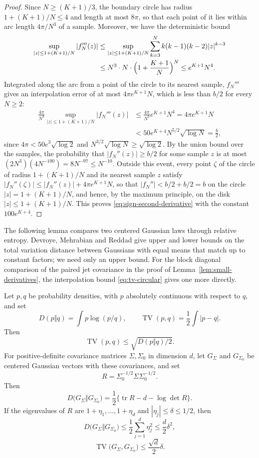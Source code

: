 \begin{proof}
Since $N\ge(K+1)/3$, the boundary circle has radius $1+(K+1)/N\le4$ and
length at most $8\pi$, so that
each point of it lies within arc length $4\pi/N^3$ of a sample.
Moreover, we have the deterministic bound
\begin{align*}
 \sup_{|z|\le1+(K+1)/N}|f_N'''(z)|
 &\le\sup_{|z|\le1+(K+1)/N}\sum_{k=3}^Nk(k-1)(k-2)|z|^{k-3}\\
 &\le N^3\cdot N\cdot\Bigl(1+\frac{K+1}N\Bigr)^N
 \le e^{K+1}N^4.
\end{align*}
Integrated along the arc from a point of the circle to its nearest
sample, $f_N'''$ gives an interpolation error of at most
$4\pi e^{K+1}N$, which is less than $b/2$ for every $N\ge2$:
\begin{align*}
 \frac{4\pi}{N^3}\sup_{|z|\le1+(K+1)/N}|f_N'''(z)|
 &\le\frac{4\pi}{N^3}e^{K+1}N^4
 =4\pi e^{K+1}N\\
 &<50e^{K+4}N^{5/2}\sqrt{\log N}
 =\frac b2,
\end{align*}
since $4\pi<50e^3\sqrt{\log2}$ and $N^{3/2}\sqrt{\log N}\ge\sqrt{\log2}$.
By the union bound over the samples, the probability that
$|f_N''(z)|\ge b/2$ for some sample $z$ is at most
$(2N^3)(4N^{-100})=8N^{-97}\le N^{-10}$.
Outside this event, every point $\zeta$ of the circle of radius
$1+(K+1)/N$ and its nearest sample $z$ satisfy
$|f_N''(\zeta)|\le|f_N''(z)|+4\pi e^{K+1}N$, so that
$|f_N''|<b/2+b/2=b$ on the circle
$|z|=1+(K+1)/N$, and hence, by the maximum principle, on the disk
$|z|\le1+(K+1)/N$. This proves \eqref{eq:sign-second-derivative} with the
constant $100e^{K+4}$.
\end{proof}

The following lemma compares two centered Gaussian laws through
relative entropy. Devroye, Mehrabian and Reddad
\cite{DevroyeMehrabianReddad2018} give upper and lower bounds on the total
variation distance between Gaussians with equal means that match up to
constant factors; we need only an upper bound. For the block diagonal
comparison of the paired jet covariance in the proof of
Lemma~\ref{lem:small-derivatives}, the interpolation bound
\eqref{eq:tv-circular} gives one more directly.

\begin{lemma}\label{lem:entropy}
Let $p,q$ be probability densities, with $p$ absolutely continuous with
respect to $q$, and set
\[
 D(p\Vert q)=\int p\log(p/q),
 \qquad \operatorname{TV}(p,q)=\frac12\int|p-q|.
\]
Then
\[
 \operatorname{TV}(p,q)\le\sqrt{D(p\Vert q)/2}.
\]
For positive-definite covariance matrices $\Sigma,\Sigma_0$ in dimension $d$, let
$G_\Sigma$ and $G_{\Sigma_0}$ be centered Gaussian vectors with these covariances, and set
\[
 R=\Sigma_0^{-1/2}\Sigma\Sigma_0^{-1/2}.
\]
Then
\[
 D\bigl(G_\Sigma\Vert G_{\Sigma_0}\bigr)
 =\frac12\{\operatorname{tr}R-d-\log\det R\}.
\]
If the eigenvalues of $R$ are $1+\eta_1,\ldots,1+\eta_d$ and
$|\eta_j|\le\delta\le1/2$, then
\[
 D\bigl(G_\Sigma\Vert G_{\Sigma_0}\bigr)
 \le\frac12\sum_{j=1}^d\eta_j^2\le\frac d2\delta^2,
\]
\[
 \operatorname{TV}\bigl(G_\Sigma,G_{\Sigma_0}\bigr)
 \le\frac{\sqrt d}{2}\delta.
\]
\end{lemma}

